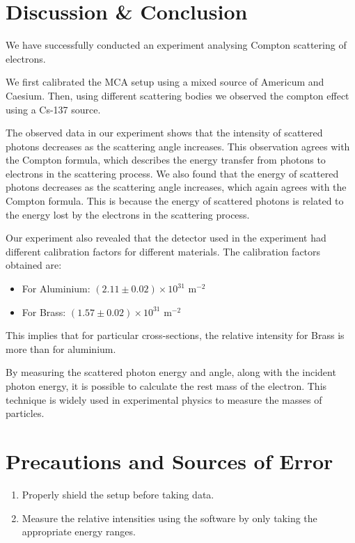 \section{Discussion \& Conclusion}

We have successfully conducted an experiment analysing Compton scattering of electrons.

We first calibrated the MCA setup using a mixed source of Americum and Caesium. Then, using different scattering bodies we observed the compton effect using a Cs-137 source.

The observed data in our experiment shows that the intensity of scattered photons decreases as the scattering angle increases. This observation agrees with the Compton formula, which describes the energy transfer from photons to electrons in the scattering process.
We also found that the energy of scattered photons decreases as the scattering angle increases, which again agrees with the Compton formula. This is because the energy of scattered photons is related to the energy lost by the electrons in the scattering process.

Our experiment also revealed that the detector used in the experiment had different calibration factors for different materials. The calibration factors obtained are:\\

\begin{itemize}
    \item For Aluminium: $(2.11 \pm 0.02)\times 10^{31}$ m$^{-2}$
    \item For Brass: $(1.57 \pm 0.02) \times 10^{31}$ m$^{-2}$\\
\end{itemize}

This implies that for particular cross-sections, the relative intensity for Brass is more than for aluminium.

By measuring the scattered photon energy and angle, along with the incident photon energy, it is possible to calculate the rest mass of the electron. This technique is widely used in experimental physics to measure the masses of particles.

\section{Precautions and Sources of Error}

\begin{enumerate}
    \item Properly shield the setup before taking data.
    \item Measure the relative intensities using the software by only taking the appropriate energy ranges.
\end{enumerate}